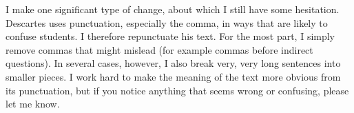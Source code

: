 I make one significant type of change, about which I still have some hesitation. Descartes uses punctuation, especially the comma, in ways that are likely to confuse students. I therefore repunctuate his text. For the most part, I simply remove commas that might mislead (for example commas before indirect questions). In several cases, however, I also break very, very long sentences into smaller pieces. I work hard to make the meaning of the text more obvious from its punctuation, but if you notice anything that seems wrong or confusing, please let me know.
